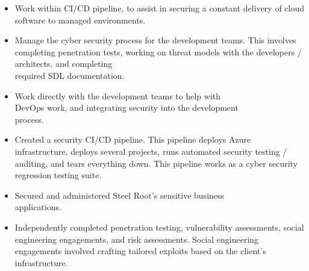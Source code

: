 \documentclass[10pt,a4paper,ragged2e]{rohrbach}
\begin{document}
\begin{paracol}{2}


\divider

\begin{itemize}
\item Work within CI/CD pipeline, to assist in securing a constant \break delivery of cloud software to managed environments.
\item Manage the cyber security process for the development teams. This involves completing penetration tests, working on threat models with the developers / architects, and completing\\ required SDL documentation. 
\item Work directly with the development teams to help with\\ DevOps work, and integrating security into the development\\ process.
\item Created a security CI/CD pipeline. This pipeline deploys Azure infrastructure, deploys several projects, runs automated security testing / auditing, and tears everything down. This pipeline works as a cyber security regression testing suite.
\end{itemize}

\divider

\begin{itemize}
\item Secured and administered Steel Root's sensitive business\\ applications.
\end{itemize}

\divider

\begin{itemize}
\item Independently completed penetration testing, vulnerability \break assessments, social engineering engagements, and risk assessments. Social engineering engagements involved crafting tailored exploits based on the client’s infrastructure.
\end{itemize}


\end{paracol}
\end{document}
